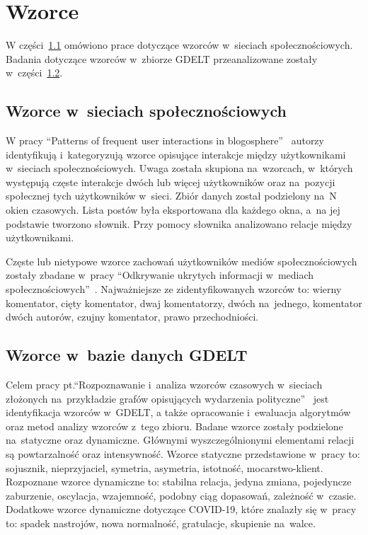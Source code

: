 \documentclass[11pt]{report}
\begin{document}
    \section{Wzorce}\label{sec:wzorce}
    W części~\ref{subsec:wzorce-w-sieciach-społecznościowych} omówiono prace dotyczące wzorców w~sieciach społecznościowych.
    Badania dotyczące wzorców w~zbiorze GDELT przeanalizowane zostały w~części~\ref{subsec:wzorce-gdelt}.

    \subsection{Wzorce w~sieciach społecznościowych}\label{subsec:wzorce-w-sieciach-społecznościowych}
    W pracy ``Patterns of frequent user interactions in blogosphere''~\cite{10.1093/jigpal/jzaa042} autorzy identyfikują i~kategoryzują wzorce opisujące interakcje między użytkownikami w~sieciach społecznościowych.
    Uwaga została skupiona na~wzorcach, w~których występują częste interakcje dwóch lub więcej użytkowników oraz na~pozycji społecznej tych użytkowników w~sieci.
    Zbiór danych został podzielony na~N okien czasowych.
    Lista postów była eksportowana dla każdego okna, a~na jej podstawie tworzono słownik.
    Przy pomocy słownika analizowano relacje między użytkownikami.

    Częste lub nietypowe wzorce zachowań użytkowników mediów społecznościowych
    zostały zbadane w~pracy ``Odkrywanie ukrytych informacji w~mediach społecznościowych''~\cite{Skwara2019}.
    Najważniejsze ze zidentyfikowanych wzorców to: wierny komentator, cięty komentator, dwaj komentatorzy, dwóch na~jednego, komentator dwóch autorów, czujny komentator, prawo przechodniości.

    \subsection{Wzorce w~bazie danych GDELT}\label{subsec:wzorce-gdelt}
    Celem pracy pt.\@ ``Rozpoznawanie i~analiza wzorców czasowych w~sieciach złożonych na~przykładzie grafów opisujących wydarzenia polityczne''~\cite{Jarosz2020}
    jest identyfikacja wzorców w~GDELT, a także opracowanie i~ewaluacja algorytmów oraz metod analizy wzorców z~tego zbioru.
    Badane wzorce zostały podzielone na~statyczne oraz dynamiczne.
    Głównymi wyszczególnionymi elementami relacji są powtarzalność oraz intensywność.
    Wzorce statyczne przedstawione w~pracy to: sojusznik, nieprzyjaciel, symetria, asymetria, istotność, mocarstwo-klient.
    Rozpoznane wzorce dynamiczne to: stabilna relacja, jedyna zmiana, pojedyncze zaburzenie, oscylacja, wzajemność, podobny ciąg dopasowań, zależność w~czasie.
    Dodatkowe wzorce dynamiczne dotyczące COVID-19, które znalazły się w~pracy to: spadek nastrojów, nowa normalność, gratulacje, skupienie na~walce.
\end{document}

